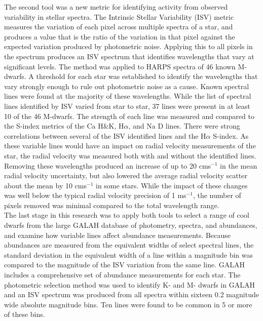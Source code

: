 The second tool was a new metric for identifying activity from observed variability in stellar spectra. The Intrinsic Stellar Variability (ISV) metric measures the variation of each pixel across multiple spectra of a star, and produces a value that is the ratio of the variation in that pixel against the expected variation produced by photometric noise. Applying this to all pixels in the spectrum produces an ISV spectrum that identifies wavelengths that vary at significant levels. The method was applied to HARPS spectra of 46 known M-dwarfs. A threshold for each star was established to identify the wavelengths that vary strongly enough to rule out photometric noise as a cause. Known spectral lines were found at the majority of these wavelengths. While the list of spectral lines identified by ISV varied from star to star, 37 lines were present in at least 10 of the 46 M-dwarfs. The strength of each line was measured and compared to the S-index metrics of the Ca H\&K, H$\alpha$, and Na D lines. There were strong correlations between several of the ISV identified lines and the H$\alpha$ S-index. As these variable lines would have an impact on radial velocity measurements of the star, the radial velocity was measured both with and without the identified lines. Removing these wavelengths produced an increase of up to 20 cms$^{-1}$ in the mean radial velocity uncertainty, but also lowered the average radial velocity scatter about the mean by 10 cms$^{-1}$ in some stars. While the impact of these changes was well below the typical radial velocity precision of 1 ms$^{-1}$, the number of pixels removed was minimal compared to the total wavelength range.\\

The last stage in this research was to apply both tools to select a range of cool dwarfs from the large GALAH database of photometry, spectra, and abundances, and examine how variable lines affect abundance measurements. Because abundances are measured from the equivalent widths of select spectral lines, the standard deviation in the equivalent width of a line within a magnitude bin was compared to the magnitude of the ISV variation from the same line. GALAH includes a comprehensive set of abundance measurements for each star. The photometric selection method was used to identify K- and M- dwarfs in GALAH and an ISV spectrum was produced from all spectra within sixteen 0.2 magnitude wide absolute magnitude bins. Ten lines were found to be common in 5 or more of these bins. \\

